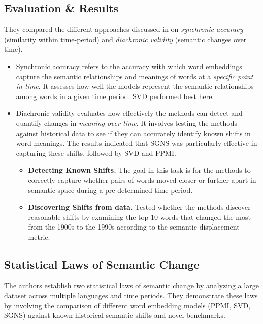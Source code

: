 \subsection{Evaluation \& Results}
They compared the different approaches discussed in  on \emph{synchronic accuracy} (similarity within time-period) and \emph{diachronic validity} (semantic changes over time).
\begin{itemize}
    \item {}
    Synchronic accuracy refers to the accuracy with which word embeddings capture the semantic relationships and meanings of words at a \emph{specific point in time}.
    It assesses how well the models represent the semantic relationships among words in a given time period.
    SVD performed best here.
    \item {}
    Diachronic validity evaluates how effectively the methods can detect and quantify changes in \emph{meaning over time}.
    It involves testing the methods against historical data to see if they can accurately identify known shifts in word meanings.
    The results indicated that SGNS was particularly effective in capturing these shifts, followed by SVD and PPMI.
    \begin{itemize}
        \item \textbf{Detecting Known Shifts.}
        The goal in this task is for the methods to correctly capture whether pairs of words moved closer or further apart in semantic space during a pre-determined time-period.

        \item \textbf{Discovering Shifts from data.}
        Tested whether the methods discover reasonable shifts by examining the top-10 words that changed the most from the 1900s to the 1990s according to the semantic displacement metric.
    \end{itemize}

\end{itemize}

\subsection{Statistical Laws of Semantic Change}
The authors establish two statistical laws of semantic change by analyzing a large dataset across multiple languages and time periods.
They demonstrate these laws by involving the comparison of different word embedding models (PPMI, SVD, SGNS) against known historical semantic shifts and novel benchmarks.

